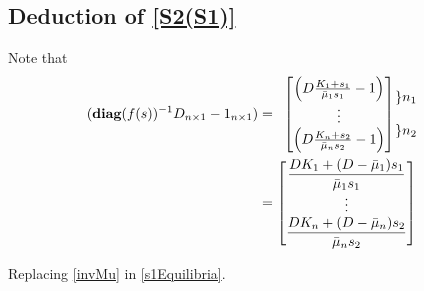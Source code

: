 \documentclass[3p,times]{elsarticle}
\newcommand{\diag}{\textbf{diag}}
\begin{document}
\subsection{Deduction of \eqref{S2(S1)}}


Note that 
\begin{align}  (\diag(f(s))^{-1}D_{n\times 1}-1_{n\times1})  & = \begin{array}{cc} 
\begin{bmatrix}
\left(D\frac{K_1+s_1}{\bar{\mu}_{1}s_1}-1 \right) \\ \vdots \\ \left(D\frac{K_n+s_2}{\bar{\mu}_{n}s_2}-1\right) 
\end{bmatrix} & \hspace{-0.5cm}\begin{array}{c} \left\} n_1\right. \\ \\ \left\} n_2\right.\end{array}
\end{array} \\
\label{invMu} 
& = \begin{bmatrix}
\dfrac{DK_1+(D-\bar{\mu}_1)s_1}{\bar{\mu}_{1}s_1} \\ \vdots \\ \dfrac{DK_n+(D-\bar{\mu}_n)s_2}{\bar{\mu}_{n}s_2} 
\end{bmatrix}
\end{align}

Replacing \eqref{invMu} in \eqref{s1Equilibria}.
\end{document}
